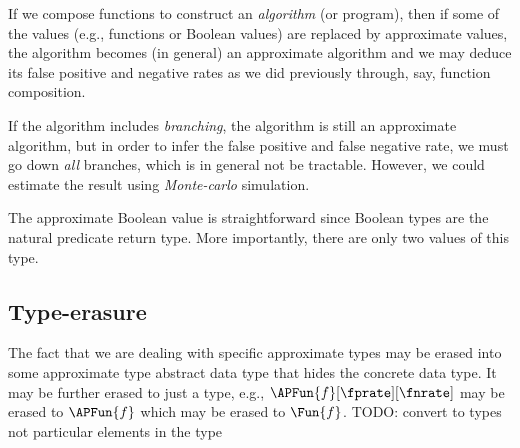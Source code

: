 \documentclass[ ../main.tex]{subfiles}
\begin{document}
If we compose functions to construct an \emph{algorithm} (or program), then if some of the values (e.g., functions or Boolean values) are replaced by approximate values, the algorithm becomes (in general) an approximate algorithm and we may deduce its false positive and negative rates as we did previously through, say, function composition.

If the algorithm includes \emph{branching}, the algorithm is still an approximate algorithm, but in order to infer the false positive and false negative rate, we must go down \emph{all} branches, which is in general not be tractable.
However, we could estimate the result using \emph{Monte-carlo} simulation.





The approximate Boolean value is straightforward since Boolean types are the natural predicate return type.
More importantly, there are only two values of this type.



	
\subsection{Type-erasure}
The fact that we are dealing with specific approximate types may be erased into some approximate type abstract data type that hides the concrete data type.
It may be further erased to just a type, e.g., $\APFun{f}[\fprate][\fnrate]$ may be erased to $\APFun{f}$ which may be erased to $\Fun{f}$.
TODO: convert to types not particular elements in the type
	
\end{document}
